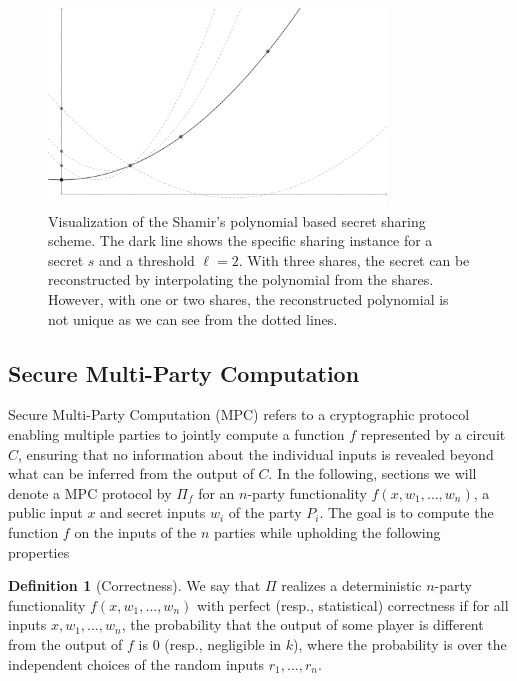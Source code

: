 \documentclass[twoside,11pt]{report}
\theoremstyle{definition}
\newtheorem{definition}{Definition}[section]
\theoremstyle{plain}
\begin{document}
\begin{figure}
  \centering
  \includegraphics[width=0.8\textwidth]{images/shamir.png}
  \caption{Visualization of the Shamir's polynomial based secret sharing scheme. The dark line shows the specific sharing instance for a secret $s$ and a threshold $\ell=2$. With three shares, the secret can be reconstructed by interpolating the polynomial from the shares. However, with one or two shares, the reconstructed polynomial is not unique as we can see from the dotted lines.}\label{fig:shamir}
\end{figure}

\subsection{Secure Multi-Party Computation}\label{sec:mpc}

Secure Multi-Party Computation (MPC) refers to a cryptographic protocol enabling multiple parties to jointly compute a function $f$ represented by a circuit $C$, ensuring that no information about the individual inputs is revealed beyond what can be inferred from the output of $C$. In the following, sections we will denote a MPC protocol by $\Pi_f$ for an $n$-party functionality $f(x, w_1, \dots, w_n)$, a public input $x$ and secret inputs $w_i$ of the party $P_i$. The goal is to compute the function $f$ on the inputs of the $n$ parties while upholding the following properties~\cite{cramer2015secure}

\begin{definition}[Correctness]\label{def:mpc-correctness}
  We say that $\Pi$ realizes a deterministic $n$-party functionality $f(x, w_1, \dots, w_n)$ with perfect (resp., statistical) correctness if for all inputs $x, w_1, \dots, w_n$, the probability that the output of some player is different from the output of $f$ is $0$ (resp., negligible in $k$), where the probability is over the independent choices of the random inputs $r_1, \dots, r_n$.
\end{definition}
\end{document}
